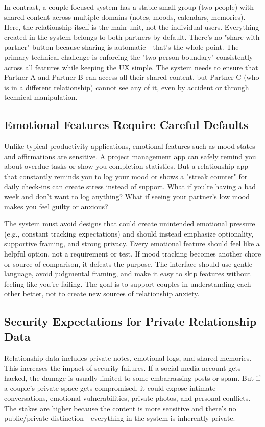 \documentclass[sigconf, authorversion, nonacm, margin=0.75in]{acmart}
\begin{document}
In contrast, a couple-focused system has a stable small group (two people) with shared content across multiple domains (notes, moods, calendars, memories). Here, the relationship itself is the main unit, not the individual users. Everything created in the system belongs to both partners by default. There's no "share with partner" button because sharing is automatic—that's the whole point. The primary technical challenge is enforcing the "two-person boundary" consistently across all features while keeping the UX simple. The system needs to ensure that Partner A and Partner B can access all their shared content, but Partner C (who is in a different relationship) cannot see any of it, even by accident or through technical manipulation.

\subsection{Emotional Features Require Careful Defaults}
Unlike typical productivity applications, emotional features such as mood states and affirmations are sensitive. A project management app can safely remind you about overdue tasks or show you completion statistics. But a relationship app that constantly reminds you to log your mood or shows a "streak counter" for daily check-ins can create stress instead of support. What if you're having a bad week and don't want to log anything? What if seeing your partner's low mood makes you feel guilty or anxious?

The system must avoid designs that could create unintended emotional pressure (e.g., constant tracking expectations) and should instead emphasize optionality, supportive framing, and strong privacy. Every emotional feature should feel like a helpful option, not a requirement or test. If mood tracking becomes another chore or source of comparison, it defeats the purpose. The interface should use gentle language, avoid judgmental framing, and make it easy to skip features without feeling like you're failing. The goal is to support couples in understanding each other better, not to create new sources of relationship anxiety.

\subsection{Security Expectations for Private Relationship Data}
Relationship data includes private notes, emotional logs, and shared memories. This increases the impact of security failures. If a social media account gets hacked, the damage is usually limited to some embarrassing posts or spam. But if a couple's private space gets compromised, it could expose intimate conversations, emotional vulnerabilities, private photos, and personal conflicts. The stakes are higher because the content is more sensitive and there's no public/private distinction—everything in the system is inherently private.
\end{document}
